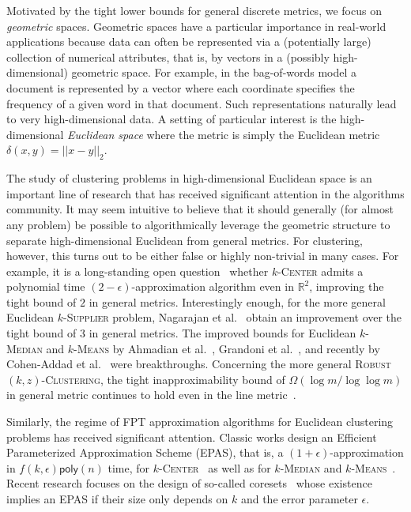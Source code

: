 \documentclass[11pt]{article}
\newcommand{\poly}{\ensuremath{\textsf{poly}}}
\newcommand{\km}{\textsc{$k$-Median}\xspace}
\newcommand{\kmns}{\textsc{$k$-Means}\xspace}
\newcommand{\kc}{\textsc{$k$-Center}\xspace}
\newcommand{\fpt}{\textsf{FPT}\xspace}
\newcommand{\rkc}{\textsc{Robust $(k,z)$-Clustering}\xspace}
\newcommand{\bR}{\ensuremath{\mathbb{R}}\xspace}
\begin{document}
Motivated by the tight lower bounds for general discrete metrics, we focus on \emph{geometric}  spaces.  
Geometric spaces have a particular importance in real-world applications because data can often be represented via a (potentially large) collection of numerical attributes, that is, by vectors in a (possibly high-dimensional) geometric space. For example, in the bag-of-words model a document is represented by a vector where each coordinate specifies the frequency of a given word in that document. Such representations naturally lead to very high-dimensional data. A setting of particular interest is the  high-dimensional \emph{Euclidean space} where the metric is simply the Euclidean metric $\delta(x,y) = ||x-y||_2$.

The study of clustering problems in high-dimensional Euclidean space is an important line of research that has received significant attention in the algorithms community. It may seem intuitive to believe that it should generally (for almost any problem) be possible to algorithmically leverage the geometric structure to separate high-dimensional Euclidean from general metrics. For clustering, however, this turns out to be either false or highly non-trivial in many cases. For example, it is a long-standing open question~\cite{feder-greene88:approx-clustering} whether \kc admits a polynomial time $(2-\epsilon)$-approximation algorithm even in $\bR^2$, improving the tight bound of $2$ in general metrics. Interestingly enough, for the more general Euclidean \textsc{$k$-Supplier} problem, Nagarajan et al.~\cite{nagarajan-etal20:euclidean-k-supplier} obtain an improvement over the tight bound of $3$ in general metrics. The improved bounds for Euclidean \km and \kmns by Ahmadian et al.~\cite{AhmadianNSW17},  Grandoni et al.~\cite{GrandoniORSV22}, and recently by Cohen-Addad et al.~\cite{cohen-addad-etal22:improved-euclidean-k-median-k-means} were breakthroughs.
Concerning the more general \rkc, the tight inapproximability bound of $\Omega(\log m/ \log \log m)$ in general metric continues to hold even in the line metric~\cite{bhattacharya2014new}.

Similarly, the regime of \fpt approximation algorithms for Euclidean clustering problems has received significant attention. Classic works design an Efficient Parameterized Approximation Scheme (EPAS), that is, a $(1+\epsilon)$-approximation in $f(k,\epsilon) \poly(n)$ time, for \kc~\cite{badoiu-etal:approximate-clustering-coresets} as well as for \km and \kmns~\cite{kumar2010linear}. Recent research focuses on the design of so-called coresets~\cite{sohler-woodruff18:coresets-k-median,cohen-addad-etal21:coreset-framework} whose existence implies an EPAS if their size only depends on $k$ and the error parameter $\epsilon$.
\end{document}
